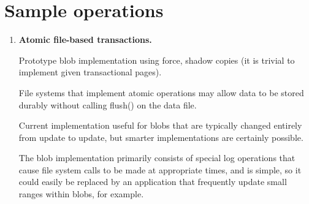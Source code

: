 \documentclass[letterpaper,twocolumn,english]{article}
\begin{document}
\section{Sample operations}

\begin{enumerate}

  \item {\bf Atomic file-based transactions. 
    
    Prototype blob implementation  using force, shadow copies (it is trivial to implement given transactional
  pages).  

  File systems that implement atomic operations may allow
  data to be stored durably without calling flush() on the data
  file. 

  Current implementation useful for blobs that are typically
  changed entirely from update to update, but smarter implementations
  are certainly possible. 

  The blob implementation primarily consists
  of special log operations that cause file system calls to be made at
  appropriate times, and is simple, so it could easily be replaced by
  an application that frequently update small ranges within blobs, for
  example.}



\end{enumerate}
\end{document}
